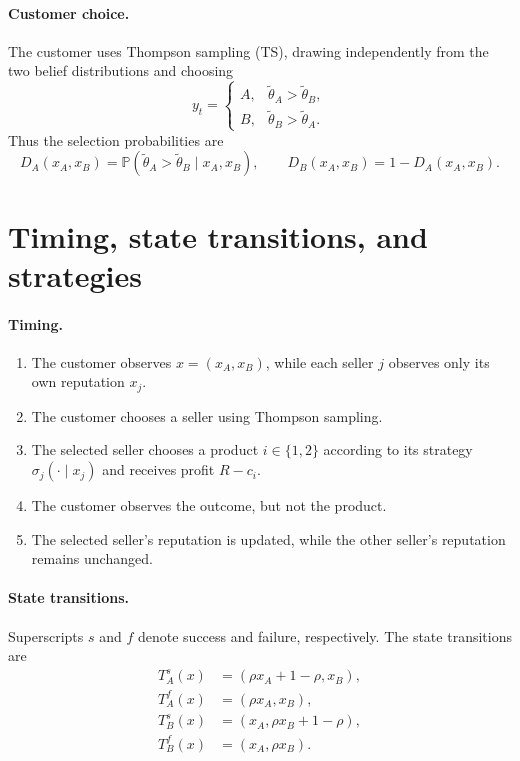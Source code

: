\documentclass[11pt]{article}
\newcommand{\Pb}{\mathbb P}
\begin{document}
\paragraph{Customer choice.}
The customer uses Thompson sampling (TS), drawing independently from the
two belief distributions and choosing
\begin{equation}
y_t=
\begin{cases}
A,&\widetilde\theta_A>\widetilde\theta_B,\\
B,&\widetilde\theta_B>\widetilde\theta_A.
\end{cases}
\end{equation}
Thus the selection probabilities are
\begin{equation}
D_A(x_A,x_B)=\Pb(\widetilde\theta_A>\widetilde\theta_B\mid x_A,x_B),
\qquad D_B(x_A,x_B)=1-D_A(x_A,x_B).
\end{equation}

\section{Timing, state transitions, and strategies}

\paragraph{Timing.}
\begin{enumerate}
    \item The customer observes $x=(x_A,x_B)$, while each
    seller $j$ observes only its own reputation $x_j$.
    
    \item The customer chooses a seller using Thompson sampling.
    
    \item The selected seller chooses a product $i\in\{1,2\}$
    according to its strategy $\sigma_j(\cdot\mid x_j)$
    and receives profit $R-c_i$.
    
    \item The customer observes the outcome, but not the product.
    
    \item The selected seller's reputation is updated, while
    the other seller's reputation remains unchanged.
\end{enumerate}

\paragraph{State transitions.}
Superscripts $s$ and $f$ denote success and failure,
respectively. The state transitions are
\begin{equation}
\begin{aligned}
T_A^s(x)&=(\rho x_A+1-\rho,x_B),\\
T_A^f(x)&=(\rho x_A,x_B),\\
T_B^s(x)&=(x_A,\rho x_B+1-\rho),\\
T_B^f(x)&=(x_A,\rho x_B).
\end{aligned}
\end{equation}
\end{document}
